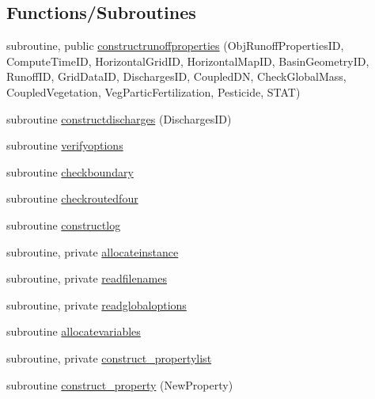 \subsection*{Functions/\+Subroutines}
\begin{DoxyCompactItemize}
\item 
subroutine, public \mbox{\hyperlink{namespacemodulerunoffproperties_a9b600e1ea55d398dd1ac832de05eccba}{constructrunoffproperties}} (Obj\+Runoff\+Properties\+ID, Compute\+Time\+ID, Horizontal\+Grid\+ID, Horizontal\+Map\+ID, Basin\+Geometry\+ID, Runoff\+ID, Grid\+Data\+ID, Discharges\+ID, Coupled\+DN, Check\+Global\+Mass, Coupled\+Vegetation, Veg\+Partic\+Fertilization, Pesticide, S\+T\+AT)
\item 
subroutine \mbox{\hyperlink{namespacemodulerunoffproperties_af8a32b20348bababc5852a1a5ce34acc}{constructdischarges}} (Discharges\+ID)
\item 
subroutine \mbox{\hyperlink{namespacemodulerunoffproperties_ab4947f5542eb22fb14b5660d0cac5ff1}{verifyoptions}}
\item 
subroutine \mbox{\hyperlink{namespacemodulerunoffproperties_aad3a8c2b2f6443fbd1a8c4ef4f14a275}{checkboundary}}
\item 
subroutine \mbox{\hyperlink{namespacemodulerunoffproperties_aabfeca3506901fe0c3708f17a7affbbd}{checkroutedfour}}
\item 
subroutine \mbox{\hyperlink{namespacemodulerunoffproperties_a5ed964a29d4214b1f4cb89bf338fc96b}{constructlog}}
\item 
subroutine, private \mbox{\hyperlink{namespacemodulerunoffproperties_a41c3c8acac2de4ef4606685a920370db}{allocateinstance}}
\item 
subroutine, private \mbox{\hyperlink{namespacemodulerunoffproperties_afd2d4bbe5b2bb177301ac47d42f33f02}{readfilenames}}
\item 
subroutine, private \mbox{\hyperlink{namespacemodulerunoffproperties_a17a988c6d85ad5ccca32ec7064ede8f2}{readglobaloptions}}
\item 
subroutine \mbox{\hyperlink{namespacemodulerunoffproperties_a2e51076442e9337406704c9d257c24cb}{allocatevariables}}
\item 
subroutine, private \mbox{\hyperlink{namespacemodulerunoffproperties_a442b6b1a6a4cd7b5b27b0fe8c4191f4e}{construct\+\_\+propertylist}}
\item 
subroutine \mbox{\hyperlink{namespacemodulerunoffproperties_aca58b5228ca3591f05eb014b1b370a57}{construct\+\_\+property}} (New\+Property)
\item 

\end{DoxyCompactItemize}
